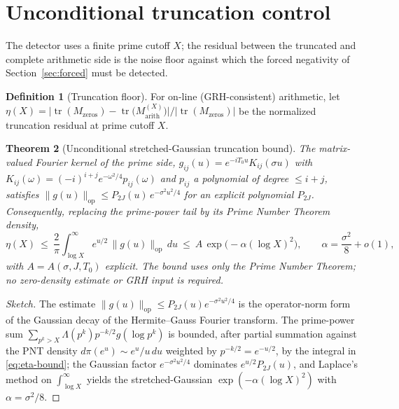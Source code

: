 \documentclass[11pt]{amsart}
\newtheorem{theorem}{Theorem}[section]
\theoremstyle{definition}
\newtheorem{definition}[theorem]{Definition}
\theoremstyle{remark}
\newcommand{\tr}{\operatorname{tr}}
\begin{document}
\section{Unconditional truncation control}\label{sec:trunc}

The detector uses a finite prime cutoff $X$; the residual between the
truncated and complete arithmetic side is the noise floor against which the
forced negativity of Section~\ref{sec:forced} must be detected.

\begin{definition}[Truncation floor]
For on-line (GRH-consistent) arithmetic, let
$\eta(X)=\bigl|\tr(M_{\mathrm{zeros}})-\tr\bigl(M_{\mathrm{arith}}^{(X)}\bigr)\bigr|
/\bigl|\tr(M_{\mathrm{zeros}})\bigr|$ be the normalized truncation residual
at prime cutoff $X$.
\end{definition}

\begin{theorem}[Unconditional stretched-Gaussian truncation bound]\label{thm:trunc}
The matrix-valued Fourier kernel of the prime side,
$g_{ij}(u)=e^{-iT_0u}K_{ij}(\sigma u)$ with
$K_{ij}(\omega)=(-i)^{i+j}e^{-\omega^2/4}p_{ij}(\omega)$ and $p_{ij}$ a
polynomial of degree $\le i+j$, satisfies
$\|g(u)\|_{\mathrm{op}}\le P_{2J}(u)\,e^{-\sigma^2u^2/4}$ for an explicit
polynomial $P_{2J}$. Consequently, replacing the prime-power tail by its
Prime Number Theorem density,
\begin{equation}\label{eq:eta-bound}
  \eta(X)\ \le\ \frac{2}{\pi}\int_{\log X}^{\infty} e^{u/2}\,\|g(u)\|_{\mathrm{op}}\,du
  \ \le\ A\,\exp\!\bigl(-\alpha(\log X)^2\bigr),
  \qquad \alpha=\frac{\sigma^2}{8}+o(1),
\end{equation}
with $A=A(\sigma,J,T_0)$ explicit. The bound uses only the Prime Number
Theorem; no zero-density estimate or GRH input is required.
\end{theorem}

\begin{proof}[Sketch]
The estimate $\|g(u)\|_{\mathrm{op}}\le P_{2J}(u)e^{-\sigma^2u^2/4}$ is the
operator-norm form of the Gaussian decay of the Hermite--Gauss Fourier
transform. The prime-power sum $\sum_{p^k>X}\Lambda(p^k)p^{-k/2}g(\log p^k)$
is bounded, after partial summation against the PNT density
$d\pi(e^u)\sim e^{u}/u\,du$ weighted by $p^{-k/2}=e^{-u/2}$, by the integral
in \eqref{eq:eta-bound}; the Gaussian factor $e^{-\sigma^2u^2/4}$ dominates
$e^{u/2}P_{2J}(u)$, and Laplace's method on $\int_{\log X}^\infty$ yields the
stretched-Gaussian $\exp(-\alpha(\log X)^2)$ with $\alpha=\sigma^2/8$.
\end{proof}
\end{document}
